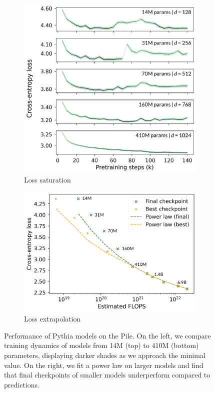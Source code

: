 \begin{figure}[h]
\centering
    \begin{subfigure}{0.37\columnwidth}
         \includegraphics[width=\linewidth]{sources/part_1/softmax_bottleneck/imgs/loss_saturation_anno.pdf}
         \caption{Loss saturation}
         \label{fig:loss_sat}
    \end{subfigure}
    \begin{subfigure}{0.42\columnwidth}
         \includegraphics[width=\linewidth]{sources/part_1/softmax_bottleneck/imgs/scaling_laws_unfit_anno.pdf}
         \caption{Loss extrapolation}
         \label{fig:scaling_law}
    \end{subfigure}
    \caption{Performance of Pythia models on the Pile. On the left, we compare training dynamics of models from 14M (top) to 410M (bottom) parameters, displaying darker shades as we approach the minimal value. On the right, we fit a power law on larger models and find that final checkpoints of smaller models underperform compared to predictions.}
    \label{fig:saturation}
\end{figure}
